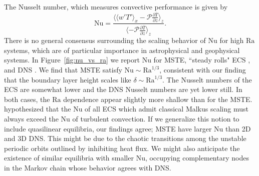 \documentclass[reprint,amsmath,amssymb,aps,nofootinbib]{revtex4-1}
\newcommand\Ra{\mathrm{Ra}}
\newcommand\Nu{\mathrm{Nu}}
\begin{document}
The Nusselt number, which measures convective performance is given by
\begin{equation}
    \Nu = \frac{\langle \langle w'T' \rangle_x - \mathcal{P}\frac{\partial \overline{T}}{\partial z} \rangle_z}{\langle- \mathcal{P}\frac{\partial \overline{T}}{\partial z} \rangle_z}.
\end{equation}
There is no general consensus surrounding the scaling behavior of $\Nu$ for high $\Ra$ systems, which are of particular importance in astrophysical and geophysical systems. In Figure~\ref{fig:nu_vs_ra} we report $\Nu$ for MSTE, ``steady rolls" ECS \cite{Wen}, and DNS \cite{Scheel_2016, Johnston}. 
We find that MSTE satisfy $\Nu \sim\Ra^{1/3}$, consistent with our finding that the boundary layer height scales like $\delta \sim \Ra^{1/3}$.
The Nusselt numbers of the ECS are somewhat lower and the DNS Nusselt numbers are yet lower still.
In both cases, the $\Ra$ dependence appear slightly more shallow than for the MSTE.
\cite{Wen} hypothesized that the $\Nu$ of all ECS which admit classical Malkus scaling must always exceed the $\Nu$ of turbulent convection.
If we generalize this notion to include quasilinear equilibria, our findings agree; MSTE have larger $\Nu$ than 2D and 3D DNS.
This might be due to the chaotic transitions among the unstable periodic orbits outlined by \cite{Yalniz, Cvitanovic} inhibiting heat flux. 
We might also anticipate the existence of similar equilibria with smaller $\Nu$, occupying complementary nodes in the Markov chain whose behavior agrees with DNS. 
\end{document}
